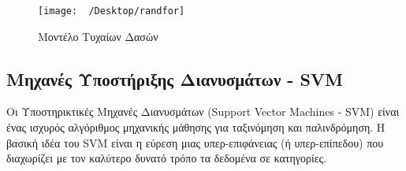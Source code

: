 \documentclass[diploma]{softlab-thesis}
\begin{document}
\begin{figure}[h]
    \centering
    \texttt{[image: ~/Desktop/randfor]} %
    \caption{Μοντέλο Τυχαίων Δασών}
    \label{fig:your_image_label}
\end{figure}


\subsection{Μηχανές Υποστήριξης Διανυσμάτων - SVM}

Οι Υποστηρικτικές Μηχανές Διανυσμάτων (Support Vector Machines - SVM) είναι ένας ισχυρός αλγόριθμος μηχανικής μάθησης για ταξινόμηση και παλινδρόμηση. Η βασική ιδέα του SVM είναι η εύρεση μιας υπερ-επιφάνειας (ή υπερ-επίπεδου) που διαχωρίζει με τον καλύτερο δυνατό τρόπο τα δεδομένα σε κατηγορίες.
\end{document}
